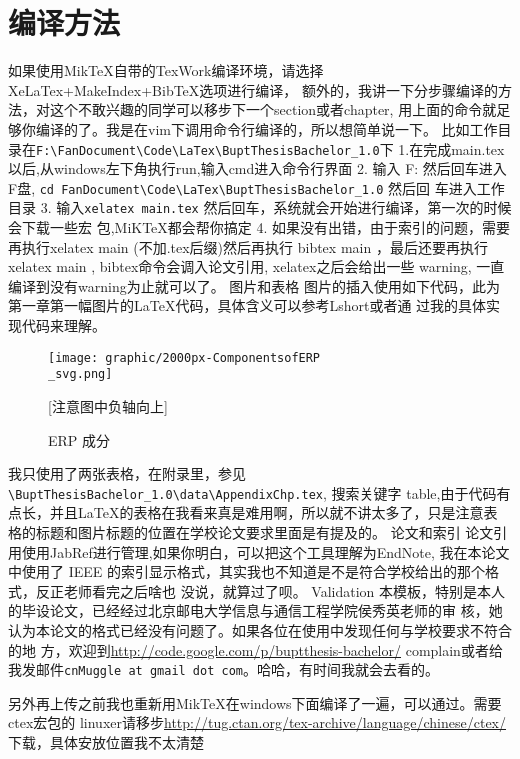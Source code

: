 \documentclass[a4paper,oneside,xetex]{ctexbook}
\begin{document}
\section{编译方法}
如果使用MikTeX自带的TexWork编译环境，请选择XeLaTex+MakeIndex+BibTeX选项进行编译，
额外的，我讲一下分步骤编译的方法，对这个不敢兴趣的同学可以移步下一个section或者chapter,
用上面的命令就足够你编译的了。我是在vim下调用命令行编译的，所以想简单说一下。
比如工作目录在\verb*|F:\FanDocument\Code\LaTex\BuptThesisBachelor_1.0|下
1.在完成main.tex以后,从windows左下角执行run,输入cmd进入命令行界面
2. 输入 F: 然后回车进入F盘, \verb*|cd FanDocument\Code\LaTex\BuptThesisBachelor_1.0| 然后回
车进入工作目录
3. 输入\verb*|xelatex main.tex| 然后回车，系统就会开始进行编译，第一次的时候会下载一些宏
包,MiKTeX都会帮你搞定
4. 如果没有出错，由于索引的问题，需要再执行xelatex main (不加.tex后缀)然后再执行
bibtex main ，最后还要再执行xelatex main , bibtex命令会调入论文引用, xelatex之后会给出一些
warning, 一直编译到没有warning为止就可以了。
图片和表格
图片的插入使用如下代码，此为第一章第一幅图片的LaTeX代码，具体含义可以参考Lshort或者通
过我的具体实现代码来理解。
\begin{verbatim*}
\begin{figure}[!hbp]
\begin{center}
\texttt{[image: graphic/2000px-ComponentsofERP\\\_svg.png]}
\caption{ERP 成分 \label{ERPComponents}}
[注意图中负轴向上]
\end{center}
\end{figure}
\end{verbatim*}
我只使用了两张表格，在附录里，参见\verb*|\BuptThesisBachelor_1.0\data\AppendixChp.tex|, 搜索关键字
table,由于代码有点长，并且LaTeX的表格在我看来真是难用啊，所以就不讲太多了，只是注意表
格的标题和图片标题的位置在学校论文要求里面是有提及的。
论文和索引
论文引用使用JabRef进行管理,如果你明白，可以把这个工具理解为EndNote, 我在本论文中使用了
IEEE 的索引显示格式，其实我也不知道是不是符合学校给出的那个格式，反正老师看完之后啥也
没说，就算过了呗。
Validation
本模板，特别是本人的毕设论文，已经经过北京邮电大学信息与通信工程学院侯秀英老师的审
核，她认为本论文的格式已经没有问题了。如果各位在使用中发现任何与学校要求不符合的地
方，欢迎到\href{http://code.google.com/p/buptthesis-bachelor/}{http://code.google.com/p/buptthesis-bachelor/} complain或者给我发邮件\verb*|cnMuggle at gmail dot com|。哈哈，有时间我就会去看的。

另外再上传之前我也重新用MikTeX在windows下面编译了一遍，可以通过。需要ctex宏包的
linuxer请移步\href{http://tug.ctan.org/tex-archive/language/chinese/ctex/}{http://tug.ctan.org/tex-archive/language/chinese/ctex/} 下载，具体安放位置我不太清楚~
\end{document}
